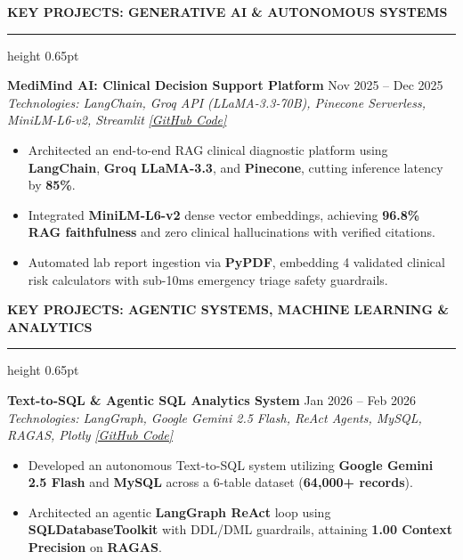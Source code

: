 \documentclass[10pt]{article}
\newcommand{\resumesection}[1]{%
  \vspace{4pt}%
  {\large \textbf{\uppercase{#1}}}%
  \vspace{1.5pt}%
  \hrule height 0.65pt%
  \vspace{3pt}%
}
\begin{document}
\resumesection{Key Projects: Generative AI \& Autonomous Systems}

\textbf{MediMind AI: Clinical Decision Support Platform} \hfill Nov 2025 -- Dec 2025\\
\textit{Technologies: LangChain, Groq API (LLaMA-3.3-70B), Pinecone Serverless, MiniLM-L6-v2, Streamlit} \hfill \href{https://github.com/Ankitiitk369/-MediMind-AI-Generative-AI-RAG-Based-Clinical-Decision-Support-Healthcare-Platform}{\textit{[GitHub Code]}}
\begin{itemize}[noitemsep, topsep=1pt, partopsep=0pt, parsep=0.5pt]
    \item Architected an end-to-end RAG clinical diagnostic platform using \textbf{LangChain}, \textbf{Groq LLaMA-3.3}, and \textbf{Pinecone}, cutting inference latency by \textbf{85\%}.
    \item Integrated \textbf{MiniLM-L6-v2} dense vector embeddings, achieving \textbf{96.8\% RAG faithfulness} and zero clinical hallucinations with verified citations.
    \item Automated lab report ingestion via \textbf{PyPDF}, embedding 4 validated clinical risk calculators with sub-10ms emergency triage safety guardrails.
\end{itemize}

\newpage

\resumesection{Key Projects: Agentic Systems, Machine Learning \& Analytics}

\textbf{Text-to-SQL \& Agentic SQL Analytics System} \hfill Jan 2026 -- Feb 2026\\
\textit{Technologies: LangGraph, Google Gemini 2.5 Flash, ReAct Agents, MySQL, RAGAS, Plotly} \hfill \href{https://github.com/Ankitiitk369/Text-to-SQL-Agentic-SQL-Analytics-System}{\textit{[GitHub Code]}}
\begin{itemize}[noitemsep, topsep=1pt, partopsep=0pt, parsep=0.5pt]
    \item Developed an autonomous Text-to-SQL system utilizing \textbf{Google Gemini 2.5 Flash} and \textbf{MySQL} across a 6-table dataset (\textbf{64,000+ records}).
    \item Architected an agentic \textbf{LangGraph ReAct} loop using \textbf{SQLDatabaseToolkit} with DDL/DML guardrails, attaining \textbf{1.00 Context Precision} on \textbf{RAGAS}.
\end{itemize}
\end{document}
